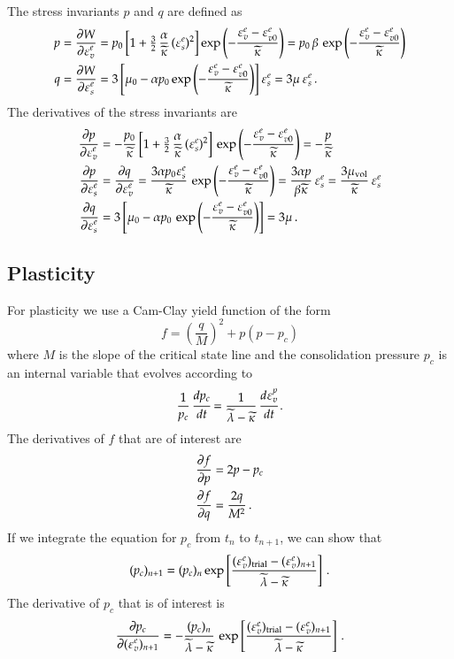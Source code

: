 \documentclass[twoside,10pt,a4paper]{article}
\begin{document}
The stress invariants $p$ and $q$ are defined as
\[
  \Bal
    p &= \Partial{W}{\Ve^e_v} = p_0\left[1 + \tfrac{3}{2}\,\frac{\alpha}{\kappatilde}\,(\Ve^e_s)^2\right]
         \exp\left(-\frac{\Ve^e_v - \Ve^e_{v0}}{\kappatilde}\right) 
       = p_0\,\beta\,\exp\left(-\frac{\Ve^e_v - \Ve^e_{v0}}{\kappatilde}\right) \\
    q &= \Partial{W}{\Ve^e_s} = 3\left[\mu_0 - \alpha p_0\exp\left(-\frac{\Ve^e_v - \Ve^e_{v0}}{\kappatilde}\right) 
         \right]\Ve^e_s  = 3\mu\,\Ve^e_s\,.
  \Eal
\]
The derivatives of the stress invariants are
\[
  \Bal
    \Partial{p}{\Ve^e_v} & = -\frac{p_0}{\kappatilde}
         \left[1 + \tfrac{3}{2}\,\frac{\alpha}{\kappatilde}\,(\Ve^e_s)^2\right]
         \,\exp\left(-\frac{\Ve^e_v - \Ve^e_{v0}}{\kappatilde}\right) 
        = -\frac{p}{\kappatilde} \\
    \Partial{p}{\Ve^e_s} & = \Partial{q}{\Ve^e_v} = \frac{3\alpha p_0 \Ve^e_s}{\kappatilde}
         \,\exp\left(-\frac{\Ve^e_v - \Ve^e_{v0}}{\kappatilde}\right) = \frac{3\alpha p}{\beta \kappatilde}\,\Ve^e_s 
         = \frac{3\mu_\Tvol}{\kappatilde}\,\Ve^e_s\\
    \Partial{q}{\Ve^e_s} & = 3 \left[\mu_0 - \alpha p_0
         \,\exp\left(-\frac{\Ve^e_v - \Ve^e_{v0}}{\kappatilde}\right) \right] = 3 \mu\,.
  \Eal
\]

\subsection{Plasticity}
For plasticity we use a Cam-Clay yield function of the form
\[
   f = \left(\frac{q}{M}\right)^2 + p(p-p_c) 
\]
where $M$ is the slope of the critical state line and the consolidation pressure $p_c$ is an internal variable that 
evolves according to 
\[
   \frac{1}{p_c}\,\Deriv{p_c}{t} = \frac{1}{\lambdatilde - \kappatilde}\,\Deriv{\Ve^p_v}{t} \,.
\]
The derivatives of $f$ that are of interest are
\[
   \Bal
     \Partial{f}{p} & = 2p - p_c \\
     \Partial{f}{q} & = \frac{2q}{M^2} \,.
   \Eal
\]
If we integrate the equation for $p_c$ from $t_{n}$ to $t_{n+1}$, we can show that
\[
   (p_c)_{n+1} = (p_c)_n \exp\left[\frac{(\Ve_v^e)_\Trial - (\Ve_v^e)_{n+1}}{\lambdatilde - \kappatilde}\right] \,.
\]
The derivative of $p_c$ that is of interest is
\[
   \Partial{p_c}{(\Ve_v^e)_{n+1}} = -\frac{(p_c)_n}{\lambdatilde-\kappatilde}\,\exp\left[\frac{(\Ve^e_v)_\Trial - (\Ve_v^e)_{n+1}}{\lambdatilde-\kappatilde}\right] \,.
\]
\end{document}
